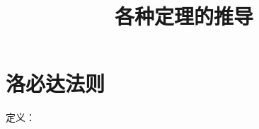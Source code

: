 \documentclass[a4paper, 12pt]{article}
\title{各种定理的推导}
\author{}
\date{}
\begin{document}
\maketitle
\tableofcontents


    \newpage
    \section{洛必达法则}
    定义：
\end{document}
